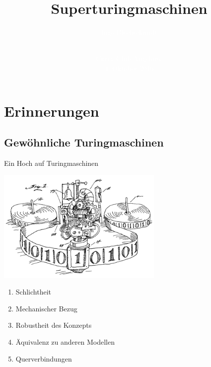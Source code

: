 \documentclass[12pt,compress,ngerman,utf8,t]{beamer}
\title[Superturingmaschinen]{Superturingmaschinen}
\author[Ingo Blechschmidt]{\textcolor{white}{Ingo Blechschmidt}}
\date[2016-10-04]{\vspace*{-4em}\ \\\textcolor{white}{\scriptsize Curry Club Augsburg \\ 4. Oktober 2016}}
\begin{document}
{
\frame{\vspace*{12em}\titlepage}}
\frame{\tableofcontents}

\section{Erinnerungen}

\subsection{Gewöhnliche Turingmaschinen}

\begin{frame}{Ein Hoch auf Turingmaschinen}
  \begin{center}
    \includegraphics[width=0.6\textwidth]{images/turing-machine}
  \end{center}

  \begin{multicols}{2}
    \begin{enumerate}
      \item Schlichtheit
      \item Mechanischer Bezug
      \item Robustheit des Konzepts
      \item Äquivalenz zu anderen Modellen
      \item Querverbindungen
    \end{enumerate}
  \end{multicols}
\end{frame}
\end{document}
